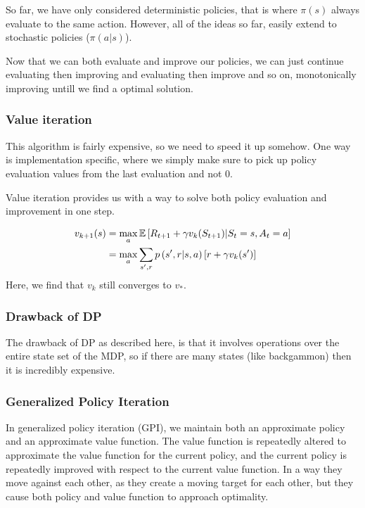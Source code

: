     So far, we have only considered deterministic policies, that is where 
    $\pi(s)$ always evaluate to the same action. However, all of the ideas so 
    far, easily extend to stochastic policies ($\pi(a|s)$).

    Now that we can both evaluate and improve our policies, we can just 
    continue evaluating then improving and evaluating then improve and so on, 
    monotonically improving untill we find a optimal solution.
    
    \subsubsection{Value iteration}
    This algorithm is fairly expensive, so we need to speed it up somehow. One 
    way is implementation specific, where we simply make sure to pick up policy 
    evaluation values from the last evaluation and not $0$.
    
    Value iteration provides us with a way to solve both policy evaluation and 
    improvement in one step.
    
    \begin{align*}
    v_{k+1}(s)&=\max_a\mathbb{E}\left[R_{t+1}+\gamma v_k(S_{t+1}) \middle\vert 
    S_t=s, A_t=a \right]\\
        &= \max_a \sum_{s',r}p\left(s',r \middle\vert s,a \right)\left[r+\gamma 
        v_k(s')\right]
    \end{align*}
    Here, we find that $v_k$ still converges to $v_*$.
    
    \subsubsection{Drawback of DP}
    The drawback of DP as described here, is that it involves operations over 
    the entire state set of the MDP, so if there are many states (like 
    backgammon) then it is incredibly expensive.
    
    \subsubsection{Generalized Policy Iteration}
    In generalized policy iteration (GPI), we maintain both an approximate 
    policy and an approximate value function. The value function is repeatedly 
    altered to approximate the value function for the current policy, and the 
    current policy is repeatedly improved with respect to the current value 
    function. In a way they move against each other, as they create a moving 
    target for each other, but they cause both policy and value function to 
    approach optimality.
    
